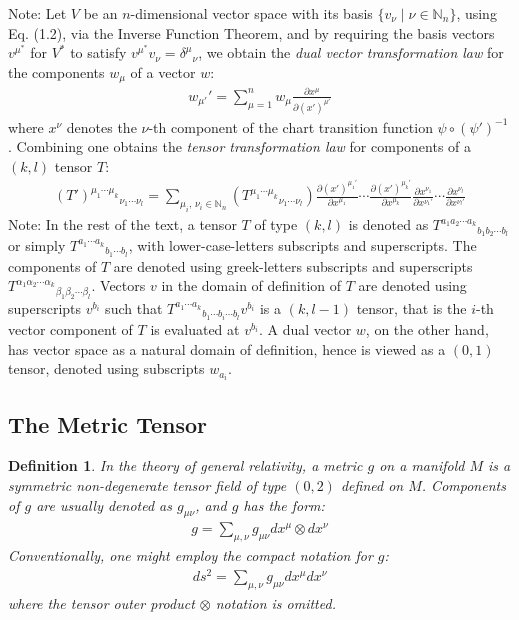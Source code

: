 \documentclass[11pt, onesided]{book}
\theoremstyle{break}
\theoremstyle{break}
\newtheorem{defn}{Definition}[thm]
\newcommand{\N}{\mathbb{N}}
\newcommand{\pd}{\partial}
\newcommand{\note}{\color{red}Note: \color{black}}
\begin{document}
\note Let $V$ be an $n$-dimensional vector space with its basis $\{v_\nu \mid \nu \in \N_n\}$, using Eq. (1.2), via the Inverse Function Theorem, and by requiring the basis vectors $v^{\mu^*}$ for $V^*$ to satisfy $v^{\mu^*}v_\nu = \delta^\mu{}_\nu$, we obtain the \textit{dual vector transformation law} for the components $w_\mu$ of a vector $w$:
\begin{align}
w_{\mu'}' = \sum_{\mu=1}^n w_\mu \frac{\pd x^\mu}{\pd (x')^{\mu'}}
\end{align}
where $x^\nu$ denotes the $\nu$-th component of the chart transition function $\psi\circ (\psi')^{-1}$. Combining one obtains the \textit{tensor transformation law} for components of a $(k,l)$ tensor $T$:
\begin{align}
(T')^{\mu_1 \cdots  \mu_{k}}{}_{\nu_1 \cdots \nu_{l}}  = \sum_{\mu_i,\, \nu_i \in \N_n}(T^{\mu_1 \cdots  \mu_{k}}{}_{\nu_1 \cdots \nu_{l}} )\frac{\pd (x')^{\mu_1'}}{\pd x^{\mu_1}}\cdots\frac{\pd (x')^{\mu_k'}}{\pd x^{\mu_k}}\frac{\pd x^{\nu_1}}{\pd x^{\nu_1'}}\cdots \frac{\pd x^{\nu_l}}{\pd x^{\nu_l'}}
\end{align}
\note In the rest of the text, a tensor $T$ of type $(k,l)$ is denoted as $T^{a_1a_2\cdots a_k}{}_{b_1b_2\cdots b_l}$ or simply $T^{a_1\cdots a_k}{}_{b_1\cdots b_l}$, with lower-case-letters subscripts and superscripts. The components of $T$ are denoted using greek-letters subscripts and superscripts $T^{\alpha_1\alpha_2\cdots \alpha_k}{}_{\beta_1\beta_2\cdots \beta_l}$. Vectors $v$ in the domain of definition of $T$ are denoted using superscripts $v^{b_i}$ such that $T^{a_1\cdots a_k}{}_{b_1\cdots b_i \cdots b_l}v^{b_i}$ is a $(k, l-1)$ tensor, that is the $i$-th vector component of $T$ is evaluated at $v^{b_i}$. A dual vector $w$, on the other hand, has vector space as a natural domain of definition, hence is viewed as a $(0,1)$ tensor, denoted using subscripts $w_{a_i}$. 

\subsection{The Metric Tensor}
\begin{defn}
In the theory of general relativity, a metric $g$ on a manifold $M$ is a symmetric non-degenerate tensor field of type $(0,2)$ defined on $M$. Components of $g$ are usually denoted as $g_{\mu\nu}$, and $g$ has the form:
\begin{align*}
g = \sum_{\mu, \nu} g_{\mu\nu}dx^\mu \otimes dx^\nu
\end{align*}
Conventionally, one might employ the compact notation for $g$:
\begin{align*}
ds^2 = \sum_{\mu,\nu}g_{\mu\nu}dx^\mu dx^\nu
\end{align*}
where the tensor outer product $\otimes$ notation is omitted.
\end{defn}
\end{document}
